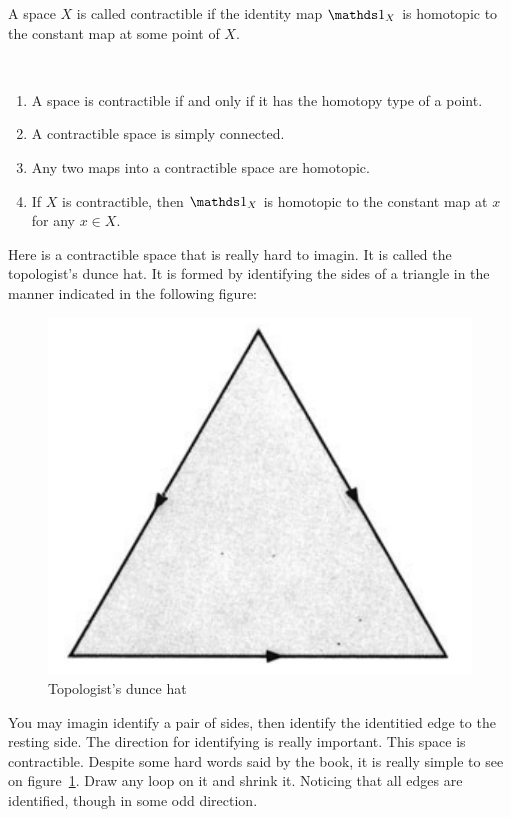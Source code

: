 \begin{defi}[Contractible]
    A space $X$ is called contractible if the identity map $\id_X$ is
    homotopic to the constant map at some point of $X$.
\end{defi}
\begin{thm}$ $

    \begin{enumerate}
        \item A space is contractible if and only if it has the
            homotopy type of a point.
        \item A contractible space is simply connected.
        \item Any two maps into a contractible space are homotopic.
        \item If $X$ is contractible, then $\id_X$ is homotopic to the
            constant map at $x$ for any $x\in X$.
    \end{enumerate}
\end{thm}
\begin{ex}
    Here is a contractible space that is really hard to imagin. It is
    called the topologist's dunce hat. It is formed by identifying the
    sides of a triangle in the manner indicated in the following
    figure:
    \begin{figure}[H]
        \centering
        \includegraphics[width=0.4\linewidth]{pics/topo-dunce-hat.PNG}
        \caption{Topologist's dunce hat}
        \label{fig:topo-d-hat}
    \end{figure}
    You may imagin identify a pair of sides, then identify the
    identitied edge to the resting side. The direction for identifying
    is really important.
    This space is contractible. Despite some hard words said by the
    book, it is really simple to see on figure~\ref{fig:topo-d-hat}.
    Draw any loop on it and shrink it. Noticing that all edges are
    identified, though in some odd direction.
\end{ex}


